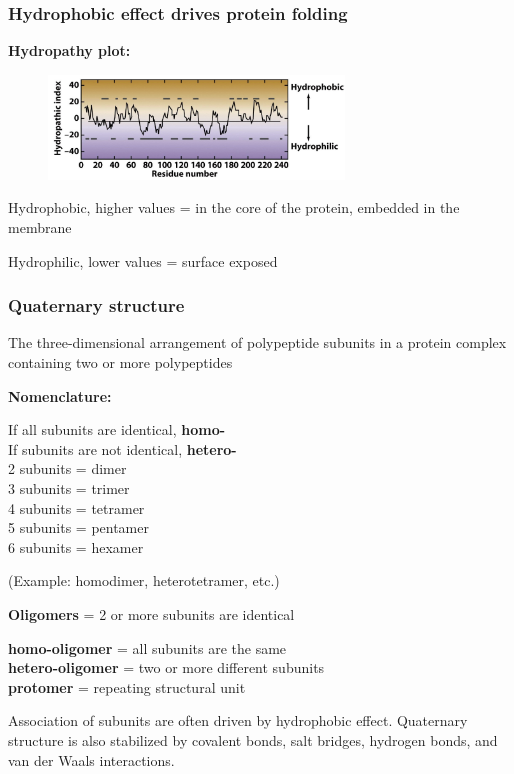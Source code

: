 \documentclass[letterpaper, 12pt]{article}
\begin{document}
\subsubsection*{Hydrophobic effect drives protein folding}

\textbf{Hydropathy plot:}

\begin{figure}[H]
\centering
\includegraphics[width=0.7\textwidth]{hydropathy}
\end{figure}

Hydrophobic, higher values = in the core of the protein, embedded in the membrane

Hydrophilic, lower values = surface exposed

\subsubsection*{Quaternary structure}

The three-dimensional arrangement of polypeptide subunits in a protein complex containing two or more polypeptides

\textbf{Nomenclature:}

If all subunits are identical, \textbf{homo-} \\
If subunits are not identical, \textbf{hetero-} \\

2 subunits = dimer \\
3 subunits = trimer \\
4 subunits = tetramer \\
5 subunits = pentamer \\
6 subunits = hexamer

(Example: homodimer, heterotetramer, etc.)

\textbf{Oligomers} = 2 or more subunits are identical

\textbf{homo-oligomer} = all subunits are the same \\
\textbf{hetero-oligomer} = two or more different subunits \\
\textbf{protomer} = repeating structural unit

Association of subunits are often driven by hydrophobic effect. Quaternary structure is also stabilized by covalent bonds, salt bridges, hydrogen bonds, and van der Waals interactions.
\end{document}
